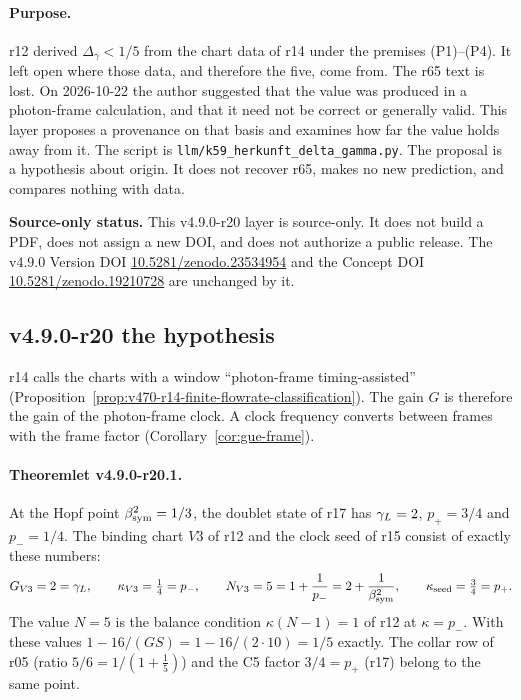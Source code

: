 \paragraph{Purpose.}
r12 derived \(\Delta_\gamma<1/5\) from the chart data of r14 under the premises (P1)--(P4).  It left open where those
data, and therefore the five, come from.  The r65 text is lost.  On 2026-10-22 the author suggested that the value was produced
in a photon-frame calculation, and that it need not be correct or generally valid.  This layer proposes a provenance on that
basis and examines how far the value holds away from it.  The script is \texttt{llm/k59\_herkunft\_delta\_gamma.py}.  The
proposal is a hypothesis about origin.  It does not recover r65, makes no new prediction, and compares nothing with data.

\noindent\textbf{Source-only status.}
This v4.9.0-r20 layer is source-only.  It does not build a PDF, does not assign a new DOI,
and does not authorize a public release.  The v4.9.0 Version DOI
\href{https://doi.org/10.5281/zenodo.23534954}{10.5281/zenodo.23534954} and the Concept DOI
\href{https://doi.org/10.5281/zenodo.19210728}{10.5281/zenodo.19210728} are unchanged by it.

\subsection*{v4.9.0-r20 the hypothesis}
\label{subsec:v490-r20-hypothesis}

r14 calls the charts with a window ``photon-frame timing-assisted'' (Proposition~\ref{prop:v470-r14-finite-flowrate-classification}).
The gain \(G\) is therefore the gain of the photon-frame clock.  A clock frequency converts between frames with the frame factor
(Corollary~\ref{cor:gue-frame}).

\paragraph{Theoremlet v4.9.0-r20.1.}
At the Hopf point \(\beta_{\mathrm{sym}}^2=1/3\), the doublet state of r17 has \(\gamma_L=2\), \(p_+=3/4\) and \(p_-=1/4\).  The binding chart \(V3\) of
r12 and the clock seed of r15 consist of exactly these numbers:
\[
G_{V3}=2=\gamma_L,\qquad \kappa_{V3}=\tfrac14=p_-,\qquad
N_{V3}=5=1+\frac1{p_-}=2+\frac1{\beta_{\mathrm{sym}}^2},\qquad \kappa_{\rm seed}=\tfrac34=p_+ .
\]
The value \(N=5\) is the balance condition \(\kappa(N-1)=1\) of r12 at \(\kappa=p_-\).  With these values
\(1-16/(GS)=1-16/(2\cdot10)=1/5\) exactly.  The collar row of r05 (ratio \(5/6=1/(1+\tfrac15)\)) and the C5 factor \(3/4=p_+\)
(r17) belong to the same point.


